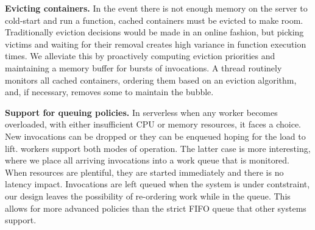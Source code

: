 \textbf{Evicting containers.}
In the event there is not enough memory on the server to cold-start and run a function, cached containers must be evicted to make room.
Traditionally eviction decisions would be made in an online fashion, but picking victims and waiting for their removal creates high variance in function execution times.
We alleviate this by proactively computing eviction priorities and maintaining a memory buffer for bursts of invocations. 
A thread routinely monitors all cached containers, ordering them based on an eviction algorithm, and, if necessary, removes some to maintain the bubble.

\textbf{Support for queuing policies.}
In serverless when any worker becomes overloaded, with either insufficient CPU or memory resources, it faces a choice.
New invocations can be dropped or they can be enqueued hoping for the load to lift.
\sysname{} workers support both modes of operation.
The latter case is more interesting, where we place all arriving invocations into a work queue that is monitored.
When resources are plentiful, they are started immediately and there is no latency impact.
Invocations are left queued when the system is under contstraint, our design leaves the possibility of re-ordering work while in the queue.
This allows for more advanced policies than the strict FIFO queue that other systems support.


